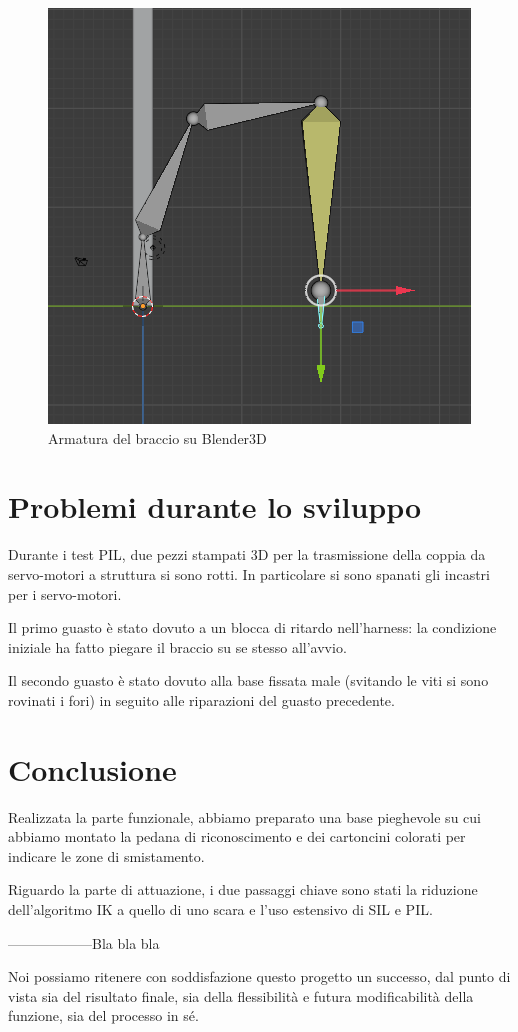 \documentclass[12pt]{report}
\begin{document}
\begin{figure}
\includegraphics[width=\textwidth]{Blender3D}
\caption{Armatura del braccio su Blender3D}
\end{figure}

\chapter{Problemi durante lo sviluppo}

Durante i test PIL, due pezzi stampati 3D per la trasmissione della coppia da servo-motori a struttura si sono rotti. In particolare si sono spanati gli incastri per i servo-motori.

Il primo guasto è stato dovuto a un blocca di ritardo nell'harness: la condizione iniziale ha fatto piegare il braccio su se stesso all'avvio.

Il secondo guasto è stato dovuto alla base fissata male (svitando le viti si sono rovinati i fori) in seguito alle riparazioni del guasto precedente.

\chapter{Conclusione}

Realizzata la parte funzionale, abbiamo preparato una base pieghevole su cui abbiamo montato la pedana di riconoscimento e dei cartoncini colorati per indicare le zone di smistamento.

Riguardo la parte di attuazione, i due passaggi chiave sono stati la riduzione dell'algoritmo IK a quello di uno scara e l'uso estensivo di SIL e PIL.


------------------Bla bla bla

Noi possiamo ritenere con soddisfazione questo progetto un successo, dal punto di vista sia del risultato finale, sia della flessibilità e futura modificabilità della funzione, sia del processo in sé.
\end{document}
